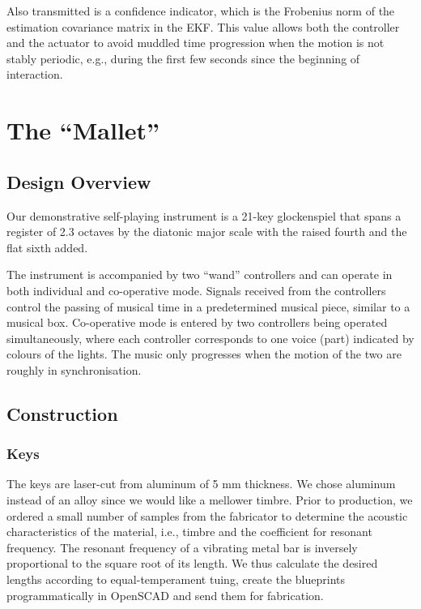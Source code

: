 \documentclass{nime-alternate} %
\begin{document}
Also transmitted is a confidence indicator, which is the Frobenius norm of the estimation covariance matrix in the EKF. This value allows both the controller and the actuator to avoid muddled time progression when the motion is not stably periodic, e.g., during the first few seconds since the beginning of interaction.

\section{The ``Mallet''}

\subsection{Design Overview}
Our demonstrative self-playing instrument is a 21-key glockenspiel that spans a register of 2.3 octaves by the diatonic major scale with the raised fourth and the flat sixth added.

The instrument is accompanied by two ``wand'' controllers and can operate in both individual and co-operative mode. Signals received from the controllers control the passing of musical time in a predetermined musical piece, similar to a musical box. Co-operative mode is entered by two controllers being operated simultaneously, where each controller corresponds to one voice (part) indicated by colours of the lights. The music only progresses when the motion of the two are roughly in synchronisation.

\subsection{Construction}
\subsubsection{Keys}
The keys are laser-cut from aluminum of 5 mm thickness. We chose aluminum instead of an alloy since we would like a mellower timbre. Prior to production, we ordered a small number of samples from the fabricator to determine the acoustic characteristics of the material, i.e., timbre and the coefficient for resonant frequency. The resonant frequency of a vibrating metal bar is inversely proportional to the square root of its length. We thus calculate the desired lengths according to equal-temperament tuing, create the blueprints programmatically in OpenSCAD and send them for fabrication.
\end{document}
